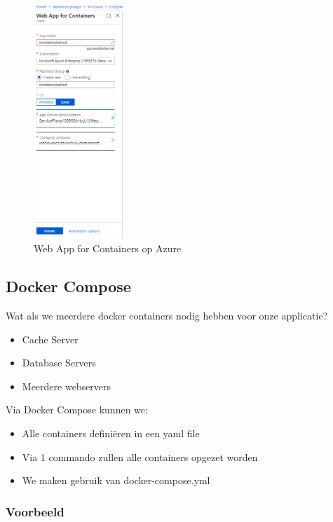 \documentclass{article}
\begin{document}
\begin{figure}[H]
    \centering
    \includegraphics[width=0.3\textwidth]{docker-container-azure.png}
    \caption{Web App for Containers op Azure}
\end{figure}


\subsection{Docker Compose}

Wat als we meerdere docker containers nodig hebben voor onze applicatie?

\begin{itemize}
    \item Cache Server
    \item Database Servers
    \item Meerdere webservers
\end{itemize}

Via Docker Compose kunnen we:

\begin{itemize}
    \item Alle containers definiëren in een yaml file
    \item Via 1 commando zullen alle containers opgezet worden
    \item We maken gebruik van docker-compose.yml
\end{itemize}

\subsubsection{Voorbeeld}
\end{document}
